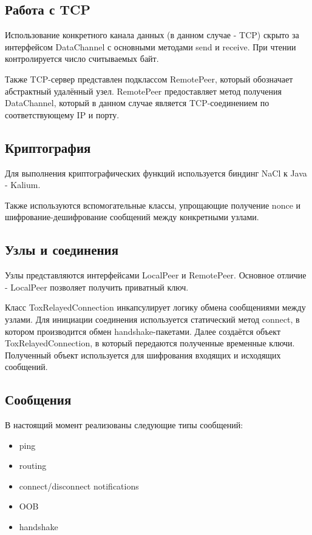 \documentclass{/home/fresheed/utils/latex/university-templates/lab-report}
\begin{document}
\subsection{Работа с TCP}

Использование конкретного канала данных (в данном случае - TCP) скрыто за интерфейсом DataChannel с основными методами send и receive. При чтении контролируется число считываемых байт. 

Также TCP-сервер представлен подклассом RemotePeer, который обозначает абстрактный удалённый узел. RemotePeer предоставляет метод получения DataChannel, который в данном случае является TCP-соединением по соответствующему IP и порту.

\subsection{Криптография}

Для выполнения криптографических функций используется биндинг NaCl к Java - Kalium. 

Также используются вспомогательные классы, упрощающие получение nonce и шифрование-дешифрование сообщений между конкретными узлами.

\subsection{Узлы и соединения}

Узлы представляются интерфейсами LocalPeer и RemotePeer. Основное отличие - LocalPeer позволяет получить приватный ключ.

Класс ToxRelayedConnection инкапсулирует логику обмена сообщениями между узлами. Для инициации соединения используется статический метод connect, в котором производится обмен handshake-пакетами. Далее создаётся объект ToxRelayedConnection, в который передаются полученные временные ключи. Полученный объект используется для шифрования входящих и исходящих сообщений.


\subsection{Сообщения}

В настоящий момент реализованы следующие типы сообщений:
\begin{itemize}
\item ping
\item routing
\item connect/disconnect notifications
\item OOB
\item handshake
\end{itemize}
\end{document}

